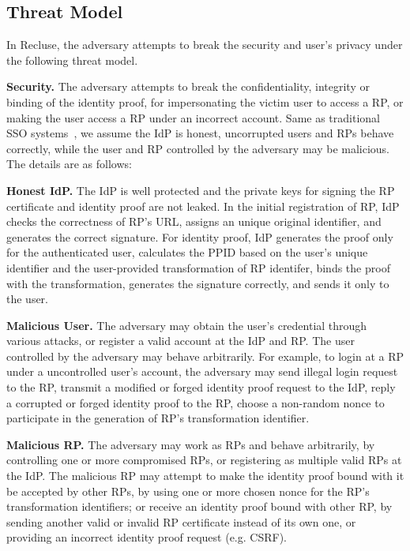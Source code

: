 \subsection{Threat Model}
\label{subsec:threatmodel}
In Recluse, the adversary attempts to break the security and user's privacy under the following threat model.

\noindent\textbf{Security.} The adversary attempts to break the confidentiality, integrity or binding of the identity proof, for impersonating the victim user to access a RP, or making the user access a RP under an incorrect account. Same as traditional SSO systems~\cite{SAMLIdentifier,OpenIDConnect,persona,SPRESSO}, we assume the IdP is honest, uncorrupted users and RPs behave correctly, while the user and RP controlled by the adversary may be malicious. The details are as follows:

\textbf{Honest IdP.} The IdP is well protected and the private keys for signing the RP certificate and identity proof are not leaked. In the initial registration of RP,  IdP checks the correctness of RP's URL,  assigns an unique original identifier, and generates the correct signature. For identity proof, IdP generates the proof only for the authenticated user, calculates the PPID based on the user's unique identifier and the user-provided transformation of RP identifer, binds the proof with the transformation, generates the signature correctly, and sends it only to the user.

\textbf{Malicious User.} The adversary may obtain the user's credential through various attacks, or register a valid account at the IdP and RP. The user controlled by the adversary may behave arbitrarily. For example, to login at a RP under a uncontrolled user's account, the adversary may send illegal login request to the RP, transmit a modified or forged identity proof request to the IdP, reply a corrupted or forged identity proof to the RP,  choose a non-random nonce to participate in the generation of RP's transformation identifier.

\textbf{Malicious RP.} The adversary may work as RPs and behave arbitrarily, by controlling one or more compromised RPs, or registering as multiple valid RPs at the IdP. The malicious RP may attempt to make the identity proof bound with it be  accepted by other RPs, by using one or more chosen nonce for the RP's transformation identifiers; or receive an identity proof bound with other RP, by sending another valid or invalid RP certificate instead of its own one, or providing an incorrect identity proof request (e.g. CSRF).

